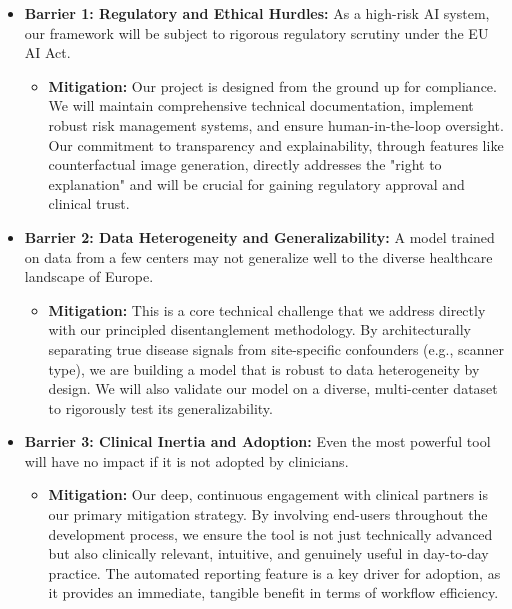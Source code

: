 \documentclass[11pt, a4paper]{article}
\begin{document}
\begin{itemize}
    \item \textbf{Barrier 1: Regulatory and Ethical Hurdles:} As a high-risk AI system, our framework will be subject to rigorous regulatory scrutiny under the EU AI Act.
    \begin{itemize}
        \item \textbf{Mitigation:} Our project is designed from the ground up for compliance. We will maintain comprehensive technical documentation, implement robust risk management systems, and ensure human-in-the-loop oversight. Our commitment to transparency and explainability, through features like counterfactual image generation, directly addresses the "right to explanation" and will be crucial for gaining regulatory approval and clinical trust.
    \end{itemize}

    \item \textbf{Barrier 2: Data Heterogeneity and Generalizability:} A model trained on data from a few centers may not generalize well to the diverse healthcare landscape of Europe.
    \begin{itemize}
        \item \textbf{Mitigation:} This is a core technical challenge that we address directly with our principled disentanglement methodology. By architecturally separating true disease signals from site-specific confounders (e.g., scanner type), we are building a model that is robust to data heterogeneity by design. We will also validate our model on a diverse, multi-center dataset to rigorously test its generalizability.
    \end{itemize}

    \item \textbf{Barrier 3: Clinical Inertia and Adoption:} Even the most powerful tool will have no impact if it is not adopted by clinicians.
    \begin{itemize}
        \item \textbf{Mitigation:} Our deep, continuous engagement with clinical partners is our primary mitigation strategy. By involving end-users throughout the development process, we ensure the tool is not just technically advanced but also clinically relevant, intuitive, and genuinely useful in day-to-day practice. The automated reporting feature is a key driver for adoption, as it provides an immediate, tangible benefit in terms of workflow efficiency.
    \end{itemize}
\end{itemize}
\end{document}
